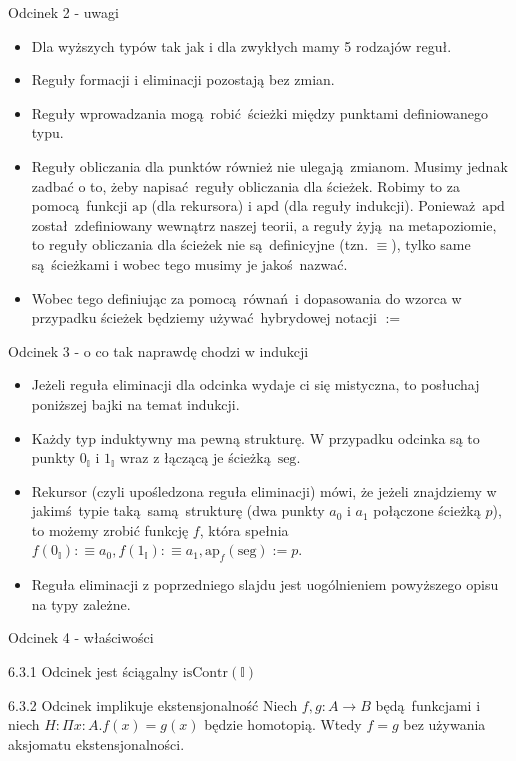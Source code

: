 \documentclass{beamer}
\newcommand{\defn}{:\equiv}
\newcommand{\ap}[2]{\text{ap}_{#1}(#2)}
\newcommand{\isContr}{\text{isContr}}
\newcommand{\I}{\mathbb{I}}
\newcommand{\IZ}{0_\mathbb{I}}
\newcommand{\II}{1_\mathbb{I}}
\newcommand{\seg}{\text{seg}}
\begin{document}
\begin{frame}{Odcinek 2 - uwagi}
\begin{itemize}
	\item Dla wyższych typów tak jak i dla zwykłych mamy 5 rodzajów reguł.
	\item Reguły formacji i eliminacji pozostają bez zmian.
	\item Reguły wprowadzania mogą robić ścieżki między punktami definiowanego typu.
	\item Reguły obliczania dla punktów również nie ulegają zmianom. Musimy jednak zadbać o to, żeby napisać reguły obliczania dla ścieżek. Robimy to za pomocą funkcji $\text{ap}$ (dla rekursora) i $\text{apd}$ (dla reguły indukcji). Ponieważ $\text{apd}$ został zdefiniowany wewnątrz naszej teorii, a reguły żyją na metapoziomie, to reguły obliczania dla ścieżek nie są definicyjne (tzn. $\equiv$), tylko same są ścieżkami i wobec tego musimy je jakoś nazwać.
	\item Wobec tego definiując za pomocą równań i dopasowania do wzorca w przypadku ścieżek będziemy używać hybrydowej notacji $:=$
\end{itemize}
\end{frame}

\begin{frame}{Odcinek 3 - o co tak naprawdę chodzi w indukcji}
\begin{itemize}
	\item Jeżeli reguła eliminacji dla odcinka wydaje ci się mistyczna, to posłuchaj poniższej bajki na temat indukcji.
	\item Każdy typ induktywny ma pewną strukturę. W przypadku odcinka są to punkty $\IZ$ i $\II$ wraz z łączącą je ścieżką $\seg$.
	\item Rekursor (czyli upośledzona reguła eliminacji) mówi, że jeżeli znajdziemy w jakimś typie taką samą strukturę (dwa punkty $a_0$ i $a_1$ połączone ścieżką $p$), to możemy zrobić funkcję $f$, która spełnia $f(\IZ) \defn a_0, f(\II) \defn a_1, \ap{f}{\seg} := p$.
	\item Reguła eliminacji z poprzedniego slajdu jest uogólnieniem powyższego opisu na typy zależne.
\end{itemize}
\end{frame}

\begin{frame}{Odcinek 4 - właściwości}
	
\begin{block}{6.3.1 Odcinek jest ściągalny}
$\isContr(\I)$
\end{block}

\begin{block}{6.3.2 Odcinek implikuje ekstensjonalność}
Niech $f, g : A \to B$ będą funkcjami i niech $H : \Pi x : A. f(x) = g(x)$ będzie homotopią. Wtedy $f = g$ bez używania aksjomatu ekstensjonalności.
\end{block}

\end{frame}
\end{document}
